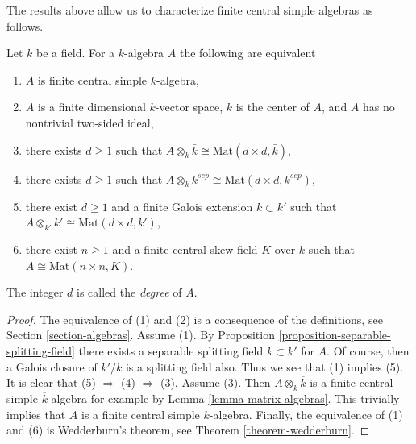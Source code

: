 \noindent
The results above allow us to characterize finite central simple algebras
as follows.

\begin{lemma}
\label{lemma-finite-central-simple-algebra}
Let $k$ be a field. For a $k$-algebra $A$ the following are equivalent
\begin{enumerate}
\item $A$ is finite central simple $k$-algebra,
\item $A$ is a finite dimensional $k$-vector space, $k$ is the center of $A$,
and $A$ has no nontrivial two-sided ideal,
\item there exists $d \geq 1$ such that
$A \otimes_k \bar k \cong \text{Mat}(d \times d, \bar k)$,
\item there exists $d \geq 1$ such that
$A \otimes_k k^{sep} \cong \text{Mat}(d \times d, k^{sep})$,
\item there exist $d \geq 1$ and a finite Galois extension $k \subset k'$
such that
$A \otimes_{k'} k' \cong \text{Mat}(d \times d, k')$,
\item there exist $n \geq 1$ and a finite central skew field $K$
over $k$ such that $A \cong \text{Mat}(n \times n, K)$.
\end{enumerate}
The integer $d$ is called the {\it degree} of $A$.
\end{lemma}

\begin{proof}
The equivalence of (1) and (2) is a consequence of the definitions, see
Section \ref{section-algebras}.
Assume (1). By
Proposition \ref{proposition-separable-splitting-field}
there exists a separable splitting field $k \subset k'$ for $A$.
Of course, then a Galois closure of $k'/k$ is a splitting field also.
Thus we see that (1) implies (5). It is clear that (5) $\Rightarrow$ (4)
$\Rightarrow$ (3). Assume (3). Then $A \otimes_k \overline{k}$
is a finite central simple $\overline{k}$-algebra for example by
Lemma \ref{lemma-matrix-algebras}.
This trivially implies that $A$ is a finite central simple $k$-algebra.
Finally, the equivalence of (1) and (6) is Wedderburn's theorem, see
Theorem \ref{theorem-wedderburn}.
\end{proof}
















